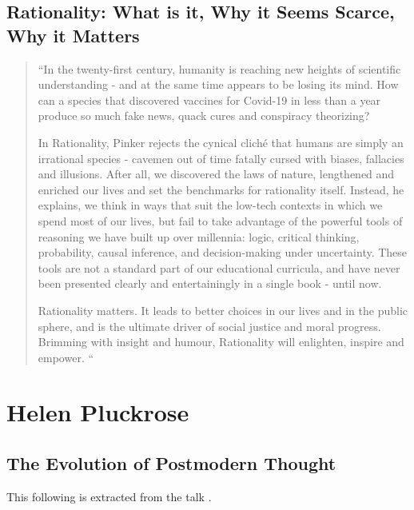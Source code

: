 \documentclass[10pt,titlepage]{book}
\begin{document}
\subsection{Rationality: What is it, Why it Seems Scarce, Why it Matters \cite{pinker-rat}}

\begin{quote}
``In the twenty-first century, humanity is reaching new heights of scientific understanding - and at the same time appears to be losing its mind. How can a species that discovered vaccines for Covid-19 in less than a year produce so much fake news, quack cures and conspiracy theorizing?

In Rationality, Pinker rejects the cynical cliché that humans are simply an irrational species - cavemen out of time fatally cursed with biases, fallacies and illusions. After all, we discovered the laws of nature, lengthened and enriched our lives and set the benchmarks for rationality itself. Instead, he explains, we think in ways that suit the low-tech contexts in which we spend most of our lives, but fail to take advantage of the powerful tools of reasoning we have built up over millennia: logic, critical thinking, probability, causal inference, and decision-making under uncertainty. These tools are not a standard part of our educational curricula, and have never been presented clearly and entertainingly in a single book - until now.

Rationality matters. It leads to better choices in our lives and in the public sphere, and is the ultimate driver of social justice and moral progress. Brimming with insight and humour, Rationality will enlighten, inspire and empower.
``
\end{quote}

\section{Helen Pluckrose}\label{PluckroseHelen}

\subsection{The Evolution of Postmodern Thought}\label{EPT}

This following is extracted from the talk \cite{pluckrose-evolution}.
\end{document}
